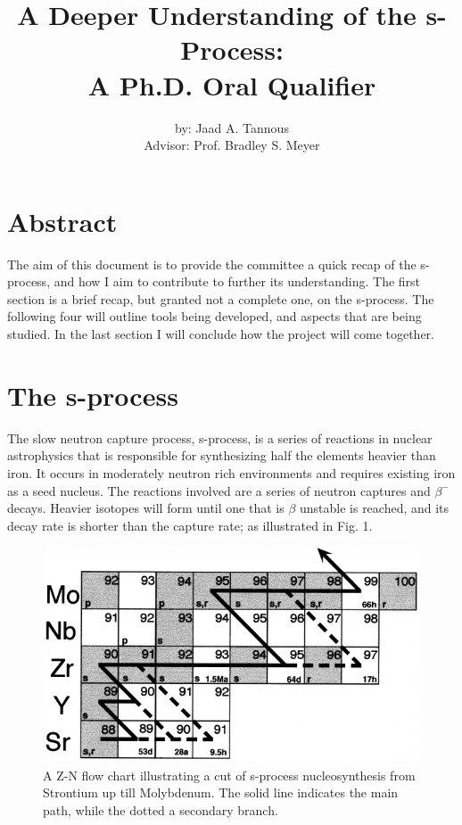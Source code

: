\documentclass{article}
\title{A Deeper Understanding of the s-Process:\\
A Ph.D. Oral Qualifier}
\author{by: Jaad A. Tannous\\
Advisor: Prof. Bradley S. Meyer}
\date{}
\begin{document}
\maketitle

\section*{Abstract}
The aim of this document is to provide the committee a quick recap of the s-process, and how I aim to 
contribute to further its understanding. The first section is a brief recap, but granted not a complete 
one, on the s-process. The following four will outline tools being developed, and aspects that are being 
studied. In the last section I will conclude how the project will come together.

\section*{The s-process}
The slow neutron capture process, s-process, is a series of reactions in nuclear astrophysics that is responsible 
for synthesizing half the elements heavier than iron. It occurs in moderately neutron rich environments and requires 
existing iron as a seed nucleus. The reactions involved are a series of neutron captures and $\beta^{-}$ decays. Heavier 
isotopes will form until one that is $\beta$ unstable is reached, and its decay rate is shorter than the capture rate; as illustrated 
in Fig. 1.

\begin{figure}[!htp]
    \centerline{\includegraphics[scale = 0.5]{images/sprocess.png}}
    \caption{A Z-N flow chart illustrating a cut of s-process nucleosynthesis from Strontium up till 
    Molybdenum. The solid line indicates the main path, while the dotted a secondary branch.\cite{nic98}}
\end{figure}
\end{document}
